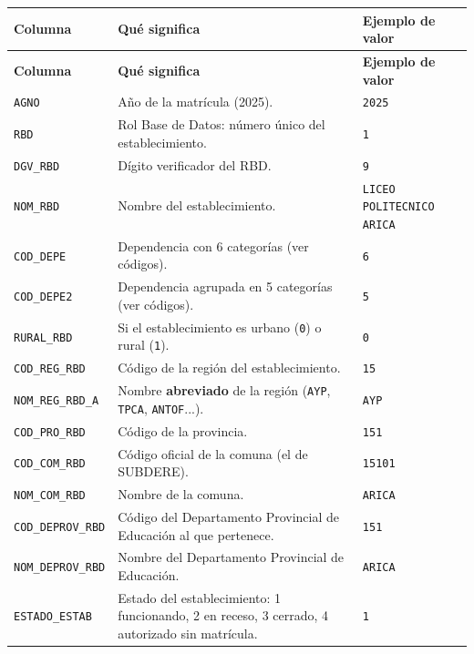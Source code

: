 \documentclass[10.5pt]{article}
\newcommand{\hdr}[1]{\textbf{\color{white}#1}}
\begin{document}
\begin{xltabular}{\linewidth}{@{}p{4.5cm} >{\raggedright\arraybackslash}X p{3.4cm}@{}}
\hdr{Columna} & \hdr{Qué significa} & \hdr{Ejemplo de valor} \\
\endfirsthead
{}\hdr{Columna} & \hdr{Qué significa} & \hdr{Ejemplo de valor} \\
\endhead
\texttt{AGNO} & Año de la matrícula (2025). & \texttt{2025} \\
\texttt{RBD} & Rol Base de Datos: número único del establecimiento. & \texttt{1} \\
\texttt{DGV\_\allowbreak{}RBD} & Dígito verificador del RBD. & \texttt{9} \\
\texttt{NOM\_\allowbreak{}RBD} & Nombre del establecimiento. & \texttt{LICEO POLITECNICO ARICA} \\
\texttt{COD\_\allowbreak{}DEPE} & Dependencia con 6 categorías (ver códigos). & \texttt{6} \\
\texttt{COD\_\allowbreak{}DEPE2} & Dependencia agrupada en 5 categorías (ver códigos). & \texttt{5} \\
\texttt{RURAL\_\allowbreak{}RBD} & Si el establecimiento es urbano (\texttt{0}) o rural (\texttt{1}). & \texttt{0} \\
\texttt{COD\_\allowbreak{}REG\_\allowbreak{}RBD} & Código de la región del establecimiento. & \texttt{15} \\
\texttt{NOM\_\allowbreak{}REG\_\allowbreak{}RBD\_\allowbreak{}A} & Nombre \textbf{abreviado} de la región (\texttt{AYP}, \texttt{TPCA}, \texttt{ANTOF}...). & \texttt{AYP} \\
\texttt{COD\_\allowbreak{}PRO\_\allowbreak{}RBD} & Código de la provincia. & \texttt{151} \\
\texttt{COD\_\allowbreak{}COM\_\allowbreak{}RBD} & Código oficial de la comuna (el de SUBDERE). & \texttt{15101} \\
\texttt{NOM\_\allowbreak{}COM\_\allowbreak{}RBD} & Nombre de la comuna. & \texttt{ARICA} \\
\texttt{COD\_\allowbreak{}DEPROV\_\allowbreak{}RBD} & Código del Departamento Provincial de Educación al que pertenece. & \texttt{151} \\
\texttt{NOM\_\allowbreak{}DEPROV\_\allowbreak{}RBD} & Nombre del Departamento Provincial de Educación. & \texttt{ARICA} \\
\texttt{ESTADO\_\allowbreak{}ESTAB} & Estado del establecimiento: 1 funcionando, 2 en receso, 3 cerrado, 4 autorizado sin matrícula. & \texttt{1} \\

\end{xltabular}
\end{document}
